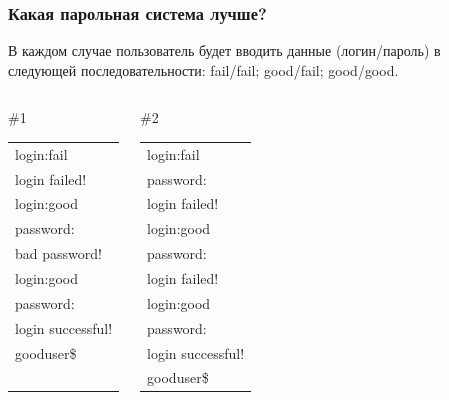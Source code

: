 \begin{frame}
    \frametitle{Какая парольная система лучше?}
    В каждом случае пользователь будет вводить данные (логин/пароль) в следующей последовательности: \alert{fail}/\alert{fail}; \alert{good}/\alert{fail}; \alert{good}/\alert{good}.
    
    \begin{columns}
            \begin{block}{\#1}
                \begin{tabular}[c]{l}
                    login:\alert{fail}\\
                    login failed!\\
                    login:\alert{good}\\
                    password:\\
                    bad password!\\
                    login:\alert{good}\\
                    password:\\
                    login successful!\\
                    gooduser\$\\
                    ~
                \end{tabular}
            \end{block}
        
            \begin{block}{\#2}
                \begin{tabular}[c]{l}
                    login:\alert{fail}\\
                    password:\\
                    login failed!\\
                    login:\alert{good}\\
                    password:\\
                    login failed!\\
                    login:\alert{good}\\
                    password:\\
                    login successful!\\
                    gooduser\$
                \end{tabular}
            \end{block}
            

\end{columns}
\end{frame}
